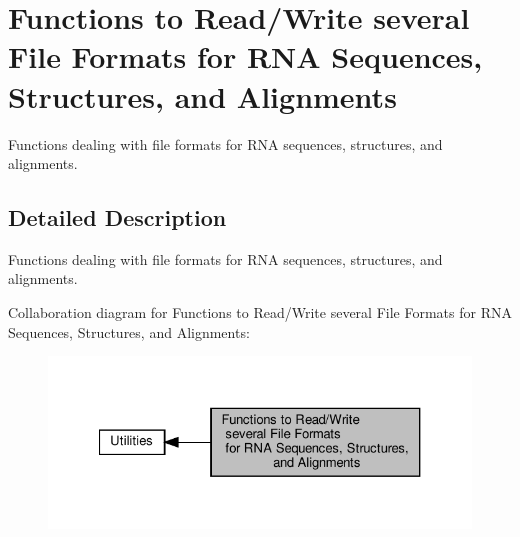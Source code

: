 \hypertarget{group__file__utils}{}\section{Functions to Read/\+Write several File Formats for R\+NA Sequences, Structures, and Alignments}
\label{group__file__utils}


Functions dealing with file formats for R\+NA sequences, structures, and alignments.  




\subsection{Detailed Description}
Functions dealing with file formats for R\+NA sequences, structures, and alignments. 

Collaboration diagram for Functions to Read/\+Write several File Formats for R\+NA Sequences, Structures, and Alignments\+:
\nopagebreak
\begin{figure}[H]
\begin{center}
\leavevmode
\includegraphics[width=327pt]{group__file__utils}
\end{center}
\end{figure}
